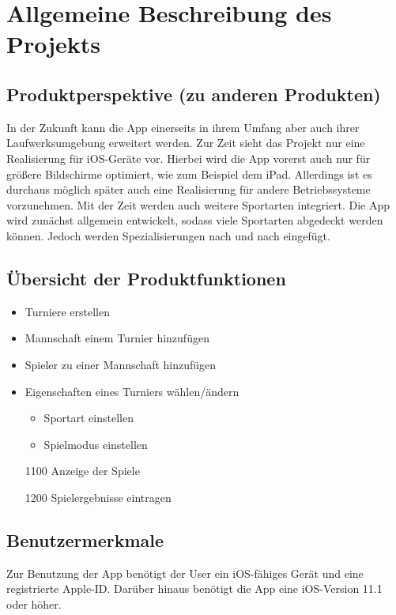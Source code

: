 \chapter{Allgemeine Beschreibung des Projekts}
\section{Produktperspektive (zu anderen Produkten)}
In der Zukunft kann die App einerseits in ihrem Umfang aber auch ihrer Laufwerksumgebung erweitert werden.
Zur Zeit sieht das Projekt nur eine Realisierung für iOS-Geräte vor. Hierbei wird die App vorerst auch nur für größere Bildschirme optimiert, wie zum Beispiel dem iPad. Allerdings ist es durchaus möglich später auch eine Realisierung für andere Betriebssysteme vorzunehmen.
Mit der Zeit werden auch weitere Sportarten integriert. Die App wird zunächst allgemein entwickelt, sodass viele Sportarten abgedeckt werden können. Jedoch werden Spezialisierungen nach und nach eingefügt.
 
\section{Übersicht der Produktfunktionen}
\begin{itemize}
		\item Turniere erstellen
		\item Mannschaft einem Turnier hinzufügen
		\item Spieler zu einer Mannschaft hinzufügen
		\item Eigenschaften eines Turniers wählen/ändern
		\begin{itemize}
			\item Sportart einstellen
			\item Spielmodus einstellen
		\end{itemize}
		\item[1100] Anzeige der Spiele
		\item[1200] Spielergebnisse eintragen
	\end{itemize}
	
\section{Benutzermerkmale}
Zur Benutzung der App benötigt der User ein iOS-fähiges Gerät und eine registrierte Apple-ID.
Darüber hinaus benötigt die App eine iOS-Version 11.1 oder höher.

